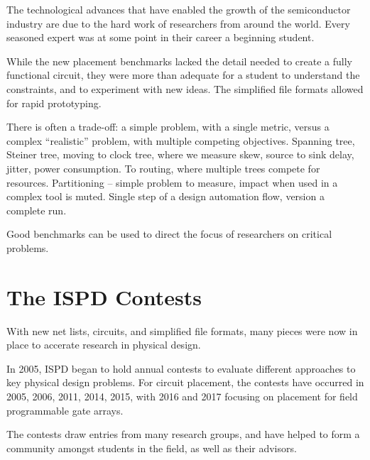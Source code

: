 \documentclass[sigconf]{acmart}
\begin{document}
The technological advances that
have enabled the growth of the semiconductor industry
are due to the hard work of researchers from around the
world.  Every seasoned expert was at some point in their
career a beginning student.

While the new placement benchmarks lacked the detail needed
to create a fully functional circuit, they were more than
adequate for a student to understand the constraints, and
to experiment with new ideas.  The simplified file formats
allowed for rapid prototyping.

There is often a trade-off:
a simple problem, with a single metric, versus
a complex ``realistic'' problem, with multiple competing
objectives.  Spanning tree, Steiner tree, moving to clock
tree, where we measure skew, source to sink delay, jitter,
power consumption.  To routing, where multiple trees compete
for resources.
Partitioning -- simple problem to measure, impact when used
in a complex tool is muted.  Single step of a design automation
flow, version a complete run.

Good benchmarks can be used to direct the focus of researchers
on critical problems.


\iffalse
Secondary objectives.  Training ground for new students
entering the field -- a way to build understanding.  Simplified
construction of tools, lower time and effort required to
experiment with new ideas.
\fi






\section{The ISPD Contests}

With new net lists, circuits, and simplified file formats,
many pieces were now in place to accerate research
in physical design.  

In 2005, ISPD began to hold annual contests to evaluate different
approaches to key physical design problems.  For circuit placement,
the contests have occurred in 2005, 2006, 2011, 2014, 2015, with 2016
and 2017 focusing on placement for field programmable gate arrays.

The contests draw entries from many research groups, and have
helped to form a community amongst students in the field, as
well as their advisors.  
\end{document}
